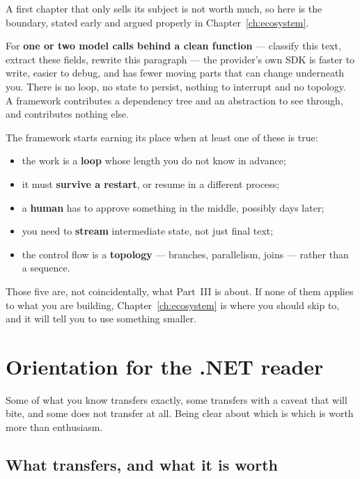 A first chapter that only sells its subject is not worth much, so here is the
boundary, stated early and argued properly in Chapter~\ref{ch:ecosystem}.

For \textbf{one or two model calls behind a clean function} --- classify this
text, extract these fields, rewrite this paragraph --- the provider's own SDK is
faster to write, easier to debug, and has fewer moving parts that can change
underneath you. There is no loop, no state to persist, nothing to interrupt and
no topology. A framework contributes a dependency tree and an abstraction to see
through, and contributes nothing else.

The framework starts earning its place when at least one of these is true:

\begin{itemize}[leftmargin=1.4em]
\item the work is a \textbf{loop} whose length you do not know in advance;
\item it must \textbf{survive a restart}, or resume in a different process;
\item a \textbf{human} has to approve something in the middle, possibly days
      later;
\item you need to \textbf{stream} intermediate state, not just final text;
\item the control flow is a \textbf{topology} --- branches, parallelism, joins
      --- rather than a sequence.
\end{itemize}

Those five are, not coincidentally, what Part~III is about. If none of them
applies to what you are building, Chapter~\ref{ch:ecosystem} is where you should
skip to, and it will tell you to use something smaller.

\section{Orientation for the .NET reader}
\label{sec:dotnet-orientation}

Some of what you know transfers exactly, some transfers with a caveat that will
bite, and some does not transfer at all. Being clear about which is which is
worth more than enthusiasm.

\subsection{What transfers, and what it is worth}

